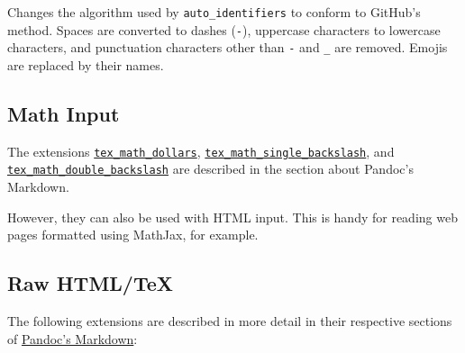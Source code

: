 Changes the algorithm used by \texttt{auto\_identifiers} to conform to
GitHub's method. Spaces are converted to dashes (\texttt{-}), uppercase
characters to lowercase characters, and punctuation characters other
than \texttt{-} and \texttt{\_} are removed. Emojis are replaced by
their names.

\hypertarget{math-input}{%
\subsection{Math Input}\label{math-input}}

The extensions
\protect\hyperlink{extension-tex_math_dollars}{\texttt{tex\_math\_dollars}},
\protect\hyperlink{extension-tex_math_single_backslash}{\texttt{tex\_math\_single\_backslash}},
and
\protect\hyperlink{extension-tex_math_double_backslash}{\texttt{tex\_math\_double\_backslash}}
are described in the section about Pandoc's Markdown.

However, they can also be used with HTML input. This is handy for
reading web pages formatted using MathJax, for example.

\hypertarget{raw-htmltex}{%
\subsection{Raw HTML/TeX}\label{raw-htmltex}}

The following extensions are described in more detail in their
respective sections of \protect\hyperlink{pandocs-markdown}{Pandoc's
Markdown}:

